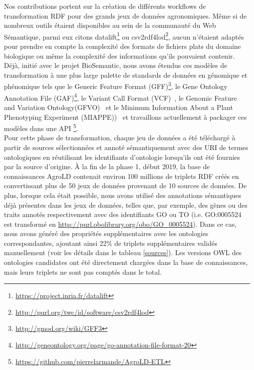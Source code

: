 Nos contributions portent sur la création de différents workflows de transformation RDF pour des grands jeux de données agronomiques. Même si de nombreux outils étaient disponibles au sein de la communauté du Web Sémantique, parmi eux citons datalift\footnote{\url{https://project.inria.fr/datalift}} ou csv2rdf4lod\footnote{\url{http://purl.org/twc/id/software/csv2rdf4lod}}, aucun n'étaient adaptés pour prendre en compte la complexité des formats de fichiers plats du domaine biologique ou même la complexité des informations qu'ils pouvaient contenir. Déjà, initié avec le projet BioSemantic, nous avons étendus ces modèles de transformation à une plus large palette de standards de données en génomique et phénomique tels que le Generic Feature Format (GFF)\footnote{\url{http://gmod.org/wiki/GFF3}}, le Gene Ontology Annotation File (GAF)\footnote{\url{http://geneontology.org/page/go-annotation-file-format-20}}, le Variant Call Format (VCF)~\cite{danecek2011}, le Genomic Feature and Variation Ontology(GFVO)~\cite{gfvo2015} et le Minimum Information About a Plant Phenotyping Experiment (MIAPPE))~\cite{miappe} et travaillons actuellement à packager ces modèles dans une API \footnote{\url{https://github.com/pierrelarmande/AgroLD-ETL}}. \\

Pour cette phase de transformation, chaque jeu de données a été téléchargé à partir de sources sélectionnées et annoté sémantiquement avec des URI de termes ontologiques en réutilisant les identifiants d’ontologie lorsqu’ils ont été fournies par la source d’origine.  À la fin de la phase 1, début 2019, la base de connaissances AgroLD contenait environ 100 millions de triplets RDF créés en convertissant plus de 50 jeux de données provenant de 10 sources de données. De plus, lorsque cela était possible, nous avons utilisé des annotations sémantiques déjà présentes dans les jeux de données, telles que, par exemple, des gènes ou des traits annotés respectivement avec des identifiants GO ou TO (i.e. GO:0005524 est transformé en \url{http://purl.obolibrary.org/obo/GO\_0005524}). Dans ce cas, nous avons généré des propriétés supplémentaires avec les ontologies correspondantes, ajoutant ainsi 22\% de triplets supplémentaires validés manuellement (voir les détails dans le tableau \ref{sources}). Les versions OWL des ontologies candidates ont été directement chargées dans la base de connaissances, mais leurs triplets ne sont pas comptés dans le total.\\


